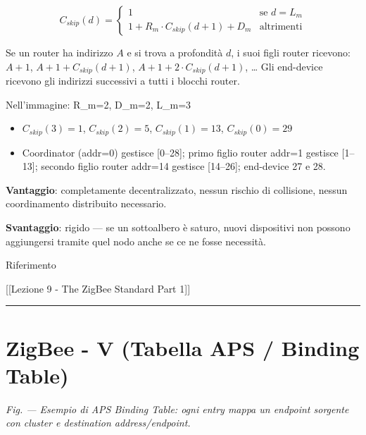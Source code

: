 \documentclass[
  italian,
  openany]{book}
\providecommand{\tightlist}{%
  \setlength{\itemsep}{0pt}\setlength{\parskip}{0pt}}
\begin{document}
\[C_{skip}(d) = \begin{cases} 1 & \text{se } d = L_m \\ 1 + R_m \cdot C_{skip}(d+1) + D_m & \text{altrimenti} \end{cases}\]

Se un router ha indirizzo \(A\) e si trova a profondità \(d\), i suoi
figli router ricevono: \(A+1\), \(A+1+C_{skip}(d+1)\),
\(A+1+2 \cdot C_{skip}(d+1)\), \ldots{} Gli end-device ricevono gli
indirizzi successivi a tutti i blocchi router.

\begin{callouttip}{Nell’immagine: R\_m=2, D\_m=2, L\_m=3}

\begin{itemize}
\tightlist
\item
  \(C_{skip}(3)=1\), \(C_{skip}(2)=5\), \(C_{skip}(1)=13\),
  \(C_{skip}(0)=29\)
\item
  Coordinator (addr=0) gestisce {[}0--28{]}; primo figlio router addr=1
  gestisce {[}1--13{]}; secondo figlio router addr=14 gestisce
  {[}14--26{]}; end-device 27 e 28.
\end{itemize}

\end{callouttip}

\textbf{Vantaggio}: completamente decentralizzato, nessun rischio di
collisione, nessun coordinamento distribuito necessario.

\textbf{Svantaggio}: rigido --- se un sottoalbero è saturo, nuovi
dispositivi non possono aggiungersi tramite quel nodo anche se ce ne
fosse necessità.

\begin{calloutnote}{Riferimento}

{[}{[}Lezione 9 - The ZigBee Standard Part 1{]}{]}

\end{calloutnote}

\begin{center}\rule{0.5\linewidth}{0.5pt}\end{center}

\section{ZigBee - V (Tabella APS / Binding
Table)}\label{zigbee---v-tabella-aps-binding-table}

\emph{Fig. --- Esempio di APS Binding Table: ogni entry mappa un
endpoint sorgente con cluster e destination address/endpoint.}
\end{document}
